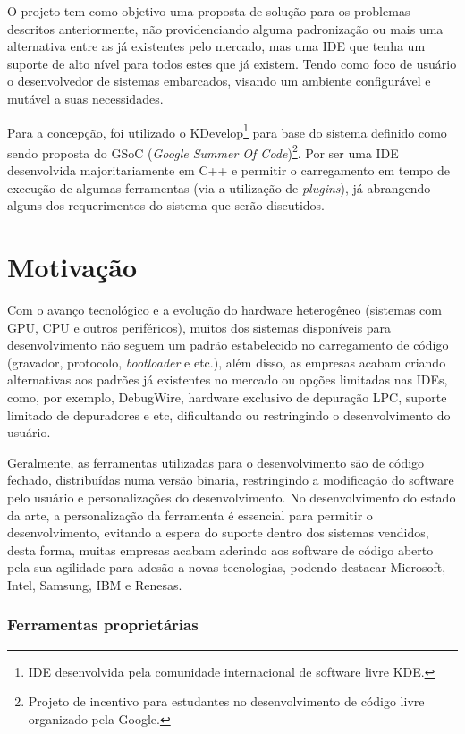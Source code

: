O projeto tem como objetivo uma proposta de solução para os problemas descritos anteriormente, não providenciando alguma padronização ou mais uma alternativa entre as já existentes pelo mercado, mas uma IDE que tenha um suporte de alto nível para todos estes que já existem. Tendo como foco de usuário o desenvolvedor de sistemas embarcados, visando um ambiente configurável e mutável a suas necessidades.

Para a concepção, foi utilizado o KDevelop\footnote{IDE desenvolvida pela comunidade internacional de software livre KDE.} para base do sistema definido como sendo proposta do GSoC (\textit{Google Summer Of Code})\footnote{Projeto de incentivo para estudantes no desenvolvimento de código livre organizado pela Google.}. Por ser uma IDE desenvolvida majoritariamente em C++ e permitir o carregamento em tempo de execução de algumas ferramentas (via a utilização de \textit{plugins}), já abrangendo alguns dos requerimentos do sistema que serão discutidos.

\section{Motivação}

Com o avanço tecnológico e a evolução do hardware heterogêneo (sistemas com GPU, CPU e outros periféricos), muitos dos sistemas disponíveis para desenvolvimento não seguem um padrão estabelecido no carregamento de código (gravador, protocolo, \textit{bootloader} e etc.), além disso, as empresas acabam criando alternativas aos padrões já
 existentes no mercado ou opções limitadas nas IDEs, como, por exemplo, DebugWire\cite{debugwire}, hardware exclusivo de depuração LPC\cite{nxp}, suporte limitado de depuradores\cite{kiledebug} e etc, dificultando ou restringindo o desenvolvimento do usuário.

Geralmente, as ferramentas utilizadas para o desenvolvimento são de código fechado, distribuídas numa versão binaria, restringindo a modificação do software pelo usuário e personalizações do desenvolvimento. No desenvolvimento do estado da arte, a personalização da ferramenta é essencial para permitir o desenvolvimento, evitando a espera do suporte dentro dos sistemas vendidos, desta forma, muitas empresas acabam aderindo aos software de código aberto pela sua agilidade para adesão a novas tecnologias, podendo destacar Microsoft\cite{microsoftn1}, Intel, Samsung, IBM e Renesas\cite{topskernel}.

\iffalse
\subsubsection{Ferramentas proprietárias}

